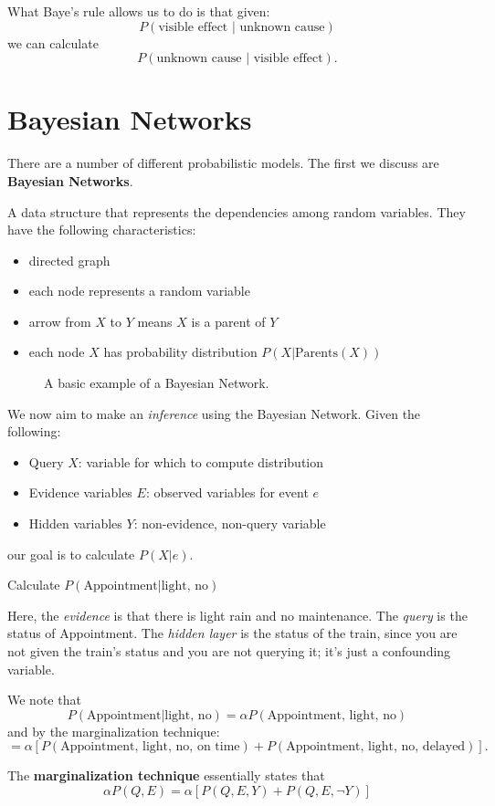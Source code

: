 What Baye's rule allows us to do is that given:
\[
	P(\text{visible effect }|\text{ unknown cause})
\]
we can calculate
\[
	P(\text{unknown cause }|\text{ visible effect}).
\]

\section{Bayesian Networks}
There are a number of different probabilistic models. The first we discuss are \textbf{Bayesian Networks}.

\begin{definition}
	A data structure that represents the dependencies among random variables. They have the following characteristics:
	\begin{itemize}
		\item directed graph
		\item each node represents a random variable
		\item arrow from \(X\) to \(Y\) means \(X\) is a parent of \(Y\)
		\item each node \(X\) has probability distribution \(P(X | \text{Parents}(X))\) 
	\end{itemize}
\end{definition}

\begin{figure}[H]
	\centering
	\caption{A basic example of a Bayesian Network.}
	\label{fig:bayeneteg}
\end{figure}

We now aim to make an \emph{inference} using the Bayesian Network. Given the following:
\begin{itemize}
	\item Query \(X\): variable for which to compute distribution
	\item Evidence variables \(E\): observed variables for event \(e\)
	\item Hidden variables \(Y\): non-evidence, non-query variable
\end{itemize}
our goal is to calculate \(P(X|e)\).

\begin{problem}
	Calculate \(P(\text{Appointment} | \text{light, no} )\) 
\end{problem}
\begin{answer}
	Here, the \emph{evidence} is that there is light rain and no maintenance. The \emph{query} is the status of Appointment. The \emph{hidden layer} is the status of the train, since you are not given the train's status and you are not querying it; it's just a confounding variable. \par

	We note that
	\[
		P(\text{Appointment} | \text{light, no} ) = \alpha P(\text{Appointment, light, no} )
	\]
	and by the marginalization technique:
	\[
		=\alpha [P(\text{Appointment, light, no, on time}) + P(\text{Appointment, light, no, delayed} )].
	\]
\end{answer}
\begin{remark}
	The \textbf{marginalization technique} essentially states that
	\[
		\alpha P(Q,E)=\alpha \left[ P(Q,E,Y) + P(Q,E,\neg Y) \right] 
	\] 
\end{remark}

